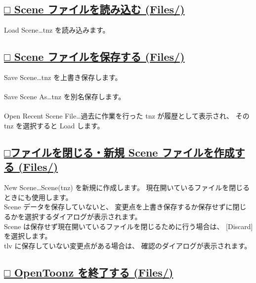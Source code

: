 \documentclass[a4paper,10pt]{article}
\begin{document}
\newpage

\subsection*{\uline{□ Scene ファイルを読み込む (Files/)}}

\noindent Load Scene…tnz を読み込みます。\\[-0.7em]

\subsection*{\uline{□ Scene ファイルを保存する (Files/)}}

\noindent Save Scene…tnz を上書き保存します。\\
\\
Save Scene As…tnz を別名保存します。\\
\\
Open Recent Scene File…過去に作業を行った tnz が履歴として表示され、 その tnz を選択すると Load します。\\

\subsection*{\uline{□ファイルを閉じる・新規 Scene ファイルを作成する (Files/)}}

\noindent New Scene…Scene(tnz) を新規に作成します。 現在開いているファイルを閉じるときにも使用します。\\
\footnotesize
Scene データを保存していないと、 変更点を上書き保存するか保存せずに閉じるかを選択するダイアログが表示されます。\\
Scene は保存せず現在開いているファイルを閉じるために行う場合は、 [Discard] を選択します。\\
tlv に保存していない変更点がある場合は、 確認のダイアログが表示されます。\\

\subsection*{\uline{□ OpenToonz を終了する (Files/)}}
\end{document}
